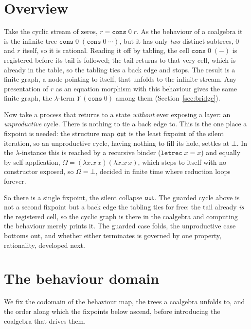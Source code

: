 \section{Overview}\label{sec:overview}
Take the cyclic stream of zeros, $r = \mathtt{cons}\;0\;r$. As the behaviour of a coalgebra it is the
infinite tree $\mathtt{cons}\;0\;(\mathtt{cons}\;0\;\cdots)$, but it has only \emph{two} distinct
subtrees, $0$ and $r$ itself, so it is rational. Reading it off by tabling, the cell
$\mathtt{cons}\;0\;(-)$ is registered before its tail is followed; the tail returns to that very
cell, which is already in the table, so the tabling ties a back edge and stops. The result is a
finite graph, a node pointing to itself, that unfolds to the infinite stream. Any presentation of $r$
as an equation morphism with this behaviour gives the same finite graph, the $\lambda$-term
$Y\,(\mathtt{cons}\;0)$ among them (Section~\ref{sec:bridge}).

Now take a process that returns to a state \emph{without} ever exposing a layer: an
\emph{unproductive} cycle. There is nothing to tie a back edge to. This is the one place a fixpoint is
needed: the structure map $\mathsf{out}$ is the least fixpoint of the silent iteration, so an unproductive
cycle, having nothing to fill its hole, settles at $\bot$. In the $\lambda$-instance this is reached
by a recursive binder ($\mathtt{letrec}\;x=x$) and equally by self-application,
$\Omega=(\lambda x.x\,x)(\lambda x.x\,x)$, which steps to itself with no constructor exposed, so
$\Omega = \bot$, decided in finite time where reduction loops forever.

So there is a single fixpoint, the silent collapse $\mathsf{out}$. The guarded cycle above is not a second
fixpoint but a back edge the tabling ties for free: the tail already \emph{is} the registered cell, so
the cyclic graph is there in the coalgebra and computing the behaviour merely prints it. The guarded case folds,
the unproductive case bottoms out, and whether either terminates is governed by one property,
rationality, developed next.

\section{The behaviour domain}\label{sec:domain}
We fix the codomain of the behaviour map, the trees a coalgebra unfolds to, and the order along which the
fixpoints below ascend, before introducing the coalgebra that drives them.

